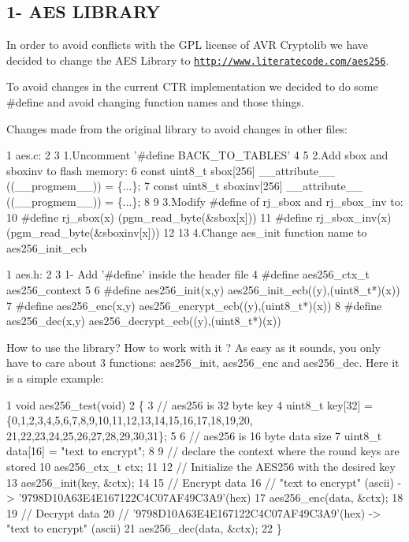 \subsection*{1-\/ A\+ES L\+I\+B\+R\+A\+RY }

In order to avoid conflicts with the G\+PL license of A\+VR Cryptolib we have decided to change the A\+ES Library to \href{http://www.literatecode.com/aes256}{\tt http\+://www.\+literatecode.\+com/aes256}.

To avoid changes in the current C\+TR implementation we decided to do some \#define and avoid changing function names and those things.

Changes made from the original library to avoid changes in other files\+: 
\begin{DoxyCode}
1 aes.c:
2 
3 1.Uncomment '#define BACK\_TO\_TABLES'
4 
5 2.Add sbox and sboxinv to flash memory:
6 const uint8\_t sbox[256] \_\_attribute\_\_ ((\_\_progmem\_\_)) = \{...\};
7 const uint8\_t sboxinv[256] \_\_attribute\_\_ ((\_\_progmem\_\_)) = \{...\};
8 
9 3.Modify #define of rj\_sbox and rj\_sbox\_inv to:
10 #define rj\_sbox(x)     (pgm\_read\_byte(&sbox[x]))
11 #define rj\_sbox\_inv(x) (pgm\_read\_byte(&sboxinv[x]))
12 
13 4.Change aes\_init function name to aes256\_init\_ecb
\end{DoxyCode}
 
\begin{DoxyCode}
1 aes.h:
2 
3 1- Add '#define' inside the header file
4 #define aes256\_ctx\_t aes256\_context
5 
6 #define aes256\_init(x,y)    aes256\_init\_ecb((y),(uint8\_t*)(x))
7 #define aes256\_enc(x,y)     aes256\_encrypt\_ecb((y),(uint8\_t*)(x))
8 #define aes256\_dec(x,y)     aes256\_decrypt\_ecb((y),(uint8\_t*)(x))
\end{DoxyCode}


How to use the library? How to work with it ? As easy as it sounds, you only have to care about 3 functions\+: aes256\+\_\+init, aes256\+\_\+enc and aes256\+\_\+dec. Here it is a simple example\+:


\begin{DoxyCode}
1 void aes256\_test(void)
2 \{
3     // aes256 is 32 byte key
4     uint8\_t key[32] = \{0,1,2,3,4,5,6,7,8,9,10,11,12,13,14,15,16,17,18,19,20,
       21,22,23,24,25,26,27,28,29,30,31\};
5 
6     // aes256 is 16 byte data size
7     uint8\_t data[16] = "text to encrypt";
8 
9     // declare the context where the round keys are stored
10     aes256\_ctx\_t ctx;
11 
12     // Initialize the AES256 with the desired key
13     aes256\_init(key, &ctx);
14 
15     // Encrypt data
16     // "text to encrypt" (ascii) -> '9798D10A63E4E167122C4C07AF49C3A9'(hex)
17     aes256\_enc(data, &ctx);
18 
19     // Decrypt data
20     // '9798D10A63E4E167122C4C07AF49C3A9'(hex) -> "text to encrypt" (ascii)
21     aes256\_dec(data, &ctx);
22 \}
\end{DoxyCode}


